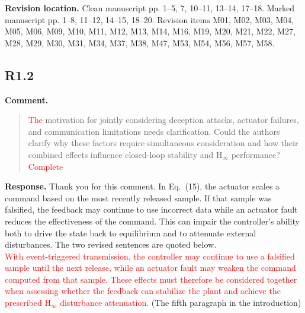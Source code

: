 \documentclass[12pt,a4paper]{article}
\begin{document}
\textbf{Revision location.} Clean manuscript pp. 1–5, 7, 10–11, 13–14, 17–18. Marked manuscript pp. 1–8, 11–12, 14–15, 18–20. Revision items M01, M02, M03, M04, M05, M06, M09, M10, M11, M12, M13, M14, M16, M19, M20, M21, M22, M27, M28, M29, M30, M31, M34, M37, M38, M47, M53, M54, M56, M57, M58.

\subsection*{R1.2}

\textbf{Comment.}
\begin{quote}
\raggedright
\textcolor{red}{The} motivation for jointly considering deception attacks, actuator failures, and communication limitations needs clarification. Could the authors clarify why these factors require simultaneous consideration and how their combined effects influence closed-loop stability and $\mathrm{H}_{\infty}$ performance? \textcolor{red}{Complete}
\end{quote}

\textbf{Response.}
Thank you for this comment. In Eq.~(15), the actuator scales a command based on the most recently released sample. If that sample was falsified, the feedback may continue to use incorrect data while an actuator fault reduces the effectiveness of the command. This can impair the controller's ability both to drive the state back to equilibrium and to attenuate external disturbances. The two revised sentences are quoted below.\\

\textcolor{red}{With event-triggered transmission, the controller may continue to use a falsified sample until the next release, while an actuator fault may weaken the command computed from that sample. These effects must therefore be considered together when assessing whether the feedback can stabilize the plant and achieve the prescribed $\mathrm{H}_\infty$ disturbance attenuation.} (The fifth paragraph in the introduction)

%
%
\end{document}

